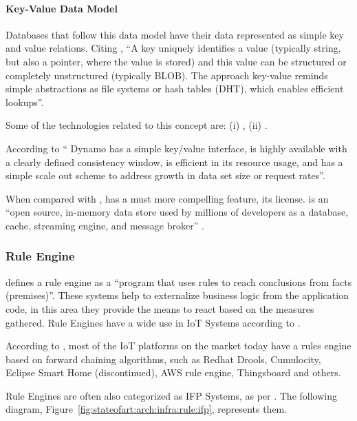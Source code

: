 \paragraph{Key-Value Data Model}
\label{par:stateofart:arch:infra:store:key}

Databases that follow this data model have their data represented as simple key and value relations. Citing \cite{pokorny2011nosql}, ``A key uniquely identifies a value (typically string, but also a pointer, where the value is stored) and this value can be structured or completely unstructured (typically BLOB). The approach key-value reminds simple abstractions as file systems or hash tables (DHT), which enables efficient lookups''.

Some of the technologies related to this concept are: (i) , (ii) .

According to \cite{decandia2007dynamo} `` Dynamo has a simple key/value interface, is highly available with a clearly defined consistency window, is efficient in its resource usage, and has a simple scale out scheme to address growth in data set size or request rates''.

When compared with ,  has a must more compelling feature, its license.  is an ``open source, in-memory data store used by millions of developers as a database, cache, streaming engine, and message broker'' \parencite{redis}.

\subsubsection{Rule Engine}
\label{subsubsec:stateofart:arch:infra:rule}

\cite{CHISHOLM20041} defines a rule engine as a ``program that uses rules to reach conclusions from facts (premises)''. These systems help to externalize business logic from the application code, in this area they provide the means to react based on the measures gathered. 
Rule Engines have a wide use in \gls{IoT} Systems according to \cite{LUO2021220, Milenkovic2020, 8938723}.

According to \cite{rules-waylay}, most of the IoT platforms on the market today have a rules engine based on forward chaining algorithms, such as Redhat Drools, Cumulocity, Eclipse Smart Home (discontinued), AWS rule engine, Thingsboard and others.

Rule Engines are often also categorized as \gls{IFP} Systems, as per \cite{cugola2012processing}.
The following diagram, Figure~\ref{fig:stateofart:arch:infra:rule:ifp}, represents them.

